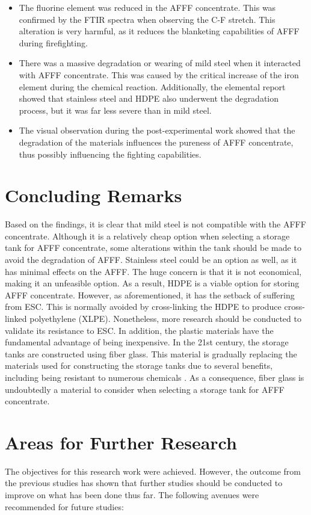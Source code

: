 \begin{itemize}
    \item The fluorine element was reduced in the AFFF concentrate. This was confirmed by the FTIR spectra when observing the C-F stretch. This alteration is very harmful, as it reduces the blanketing capabilities of AFFF during firefighting.
    \item There was a massive degradation or wearing of mild steel when it interacted with AFFF concentrate. This was caused by the critical increase of the iron element during the chemical reaction. Additionally, the elemental report showed that stainless steel and HDPE also underwent the degradation process, but it was far less severe than in mild steel.
    \item The visual observation during the post-experimental work showed that the degradation of the materials influences the pureness of AFFF concentrate, thus possibly influencing the fighting capabilities.
\end{itemize}

\section{Concluding Remarks}
Based on the findings, it is clear that mild steel is not compatible with the AFFF concentrate. Although it is a relatively cheap option when selecting a storage tank for AFFF concentrate, some alterations within the tank should be made to avoid the degradation of AFFF. Stainless steel could be an option as well, as it has minimal effects on the AFFF. The huge concern is that it is not economical, making it an unfeasible option. As a result, HDPE is a viable option for storing AFFF concentrate. However, as aforementioned, it has the setback of suffering from ESC. This is normally avoided by cross-linking the HDPE to produce cross-linked polyethylene (XLPE). Nonetheless, more research should be conducted to validate its resistance to ESC. In addition, the plastic materials have the fundamental advantage of being inexpensive.
In the 21st century, the storage tanks are constructed using fiber glass. This material is gradually replacing the materials used for constructing the storage tanks due to several benefits, including being resistant to numerous chemicals \cite{avdeeva2016chemical}. As a consequence, fiber glass is undoubtedly a material to consider when selecting a storage tank for AFFF concentrate.

\section{Areas for Further Research}
The objectives for this research work were achieved. However, the outcome from the previous studies has shown that further studies should be conducted to improve on what has been done thus far. The following avenues were recommended for future studies: 


